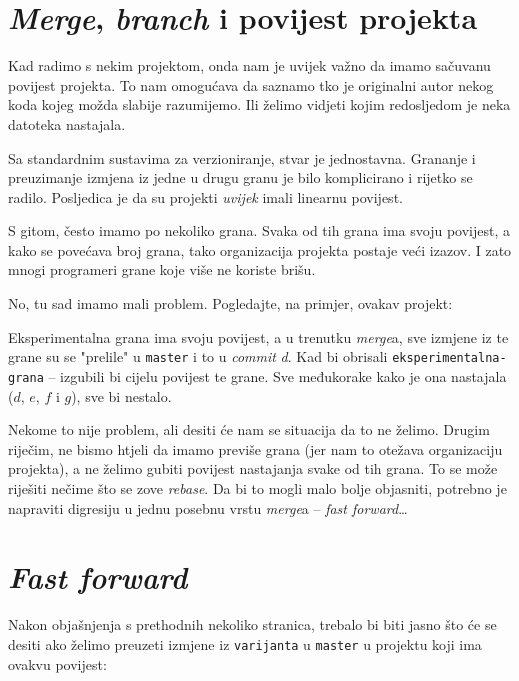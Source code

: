 
\section*{\emph{Merge}, \emph{branch} i povijest projekta}

Kad radimo s nekim projektom, onda nam je uvijek važno da imamo sačuvanu povijest projekta.
To nam omogućava da saznamo tko je originalni autor nekog koda kojeg možda slabije razumijemo.
Ili želimo vidjeti kojim redosljedom je neka datoteka nastajala.

Sa standardnim sustavima za verzioniranje, stvar je jednostavna. 
Grananje i preuzimanje izmjena iz jedne u drugu granu je bilo komplicirano i rijetko se radilo. 
Posljedica je da su projekti \emph{uvijek} imali linearnu povijest.



S gitom, često imamo po nekoliko grana.
Svaka od tih grana ima svoju povijest, a kako se povećava broj grana, tako organizacija projekta postaje veći izazov.
I zato mnogi programeri grane koje više ne koriste brišu.

No, tu sad imamo mali problem.
Pogledajte, na primjer, ovakav projekt:



Eksperimentalna grana ima svoju povijest, a u trenutku \emph{merge}a, sve izmjene iz te grane su se "prelile" u \verb+master+ i to u \emph{commit} \emph d.
Kad bi obrisali \verb+eksperimentalna-grana+ -- izgubili bi cijelu povijest te grane.
Sve međukorake kako je ona nastajala ($d$, $e$, $f$ i $g$), sve bi nestalo.

Nekome to nije problem, ali desiti će nam se situacija da to ne želimo.
Drugim riječim, ne bismo htjeli da imamo previše grana (jer nam to otežava organizaciju projekta), a ne želimo gubiti povijest nastajanja svake od tih grana.
To se može riješiti nečime što se zove \emph{rebase}.
Da bi to mogli malo bolje objasniti, potrebno je napraviti digresiju u jednu posebnu vrstu \emph{merge}a -- \emph{fast forward}\dots

\section*{\emph{Fast forward}}

Nakon objašnjenja s prethodnih nekoliko stranica, trebalo bi biti jasno što će se desiti ako želimo preuzeti izmjene iz \verb+varijanta+ u \verb+master+ u projektu koji ima ovakvu povijest:

